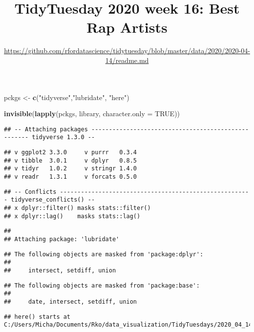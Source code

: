 \documentclass[
]{article}
\title{TidyTuesday 2020 week 16: Best Rap Artists}
\subtitle{\url{https://github.com/rfordatascience/tidytuesday/blob/master/data/2020/2020-04-14/readme.md}}
\author{}
\date{\vspace{-2.5em}}
\newenvironment{Shaded}{\begin{snugshade}}{\end{snugshade}}
\newcommand{\DataTypeTok}[1]{\textcolor[rgb]{0.13,0.29,0.53}{#1}}
\newcommand{\KeywordTok}[1]{\textcolor[rgb]{0.13,0.29,0.53}{\textbf{#1}}}
\newcommand{\NormalTok}[1]{#1}
\newcommand{\OtherTok}[1]{\textcolor[rgb]{0.56,0.35,0.01}{#1}}
\newcommand{\StringTok}[1]{\textcolor[rgb]{0.31,0.60,0.02}{#1}}
\begin{document}
\maketitle

\begin{Shaded}
\begin{Highlighting}[]
\NormalTok{pckgs <-}\StringTok{ }\KeywordTok{c}\NormalTok{(}\StringTok{"tidyverse"}\NormalTok{,}\StringTok{"lubridate"}\NormalTok{, }\StringTok{"here"}\NormalTok{)}

\KeywordTok{invisible}\NormalTok{(}\KeywordTok{lapply}\NormalTok{(pckgs, library, }\DataTypeTok{character.only =} \OtherTok{TRUE}\NormalTok{))}
\end{Highlighting}
\end{Shaded}

\begin{verbatim}
## -- Attaching packages ---------------------------------------------------- tidyverse 1.3.0 --
\end{verbatim}

\begin{verbatim}
## v ggplot2 3.3.0     v purrr   0.3.4
## v tibble  3.0.1     v dplyr   0.8.5
## v tidyr   1.0.2     v stringr 1.4.0
## v readr   1.3.1     v forcats 0.5.0
\end{verbatim}

\begin{verbatim}
## -- Conflicts ------------------------------------------------------- tidyverse_conflicts() --
## x dplyr::filter() masks stats::filter()
## x dplyr::lag()    masks stats::lag()
\end{verbatim}

\begin{verbatim}
## 
## Attaching package: 'lubridate'
\end{verbatim}

\begin{verbatim}
## The following objects are masked from 'package:dplyr':
## 
##     intersect, setdiff, union
\end{verbatim}

\begin{verbatim}
## The following objects are masked from 'package:base':
## 
##     date, intersect, setdiff, union
\end{verbatim}

\begin{verbatim}
## here() starts at C:/Users/Micha/Documents/Rko/data_visualization/TidyTuesdays/2020_04_14
\end{verbatim}
\end{document}
